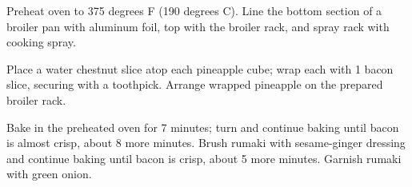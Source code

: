 
\info[servings=24,
		time = 40, 
		energy = 40 (each),
		cost =  25,
		urlsource = http://allrecipes.com/recipe/235095/easy-rumaki-with-pineapple/]{}

\begin{ingredients}
\end{ingredients}

\begin{preparation}
	\step Preheat oven to 375 degrees F (190 degrees C). Line the bottom section of a broiler pan with aluminum foil, top with the broiler rack, and spray rack with cooking spray.
	
	\step Place a water chestnut slice atop each pineapple cube; wrap each with 1 bacon slice, securing with a toothpick. Arrange wrapped pineapple on the prepared broiler rack. 
	
	\step Bake in the preheated oven for 7 minutes; turn and continue baking until bacon is almost crisp, about 8 more minutes. Brush rumaki with sesame-ginger dressing and continue baking until bacon is crisp, about 5 more minutes. Garnish rumaki with green onion. 
\end{preparation}

\begin{notes}
\end{notes}

